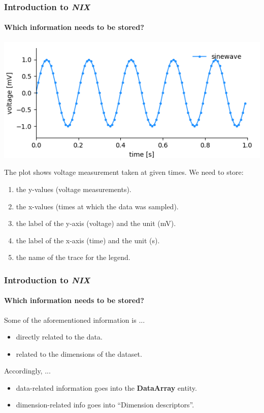 \documentclass[pdftex, xcolor=table]{beamer}
\newcommand{\nix}{\textit{NIX}}
\newcommand{\dataarray}{\textbf{DataArray}}
\begin{document}
\begin{frame}[fragile]
  \frametitle{Introduction to \nix{}}
  \framesubtitle{Which information needs to be stored?}

  \begin{center}
    \includegraphics[width=0.7\columnwidth]{images/regular_sampled.png}
  \end{center}
  The plot shows voltage measurement taken at given times. We need to store:
  \begin{enumerate}
  \item the y-values (voltage measurements).
  \item the x-values (times at which the data was sampled).
  \item the label of the y-axis (voltage) and the unit (mV).
  \item the label of the x-axis (time) and the unit (s).
  \item the name of the trace for the legend.
  \end{enumerate}
\end{frame}


\begin{frame}[fragile]
  \frametitle{Introduction to \nix{}}
  \framesubtitle{Which information needs to be stored?}

  Some of the aforementioned information is ...
  \begin{itemize}
  \item directly related to the data.
  \item related to the dimensions of the dataset.
  \end{itemize}
  \pause
  \vspace{3ex}
  Accordingly, ...
  \begin{itemize}
  \item data-related information goes into the \dataarray{} entity.
  \item dimension-related info goes into ``Dimension descriptors''.
  \end{itemize}
\end{frame}
\end{document}
